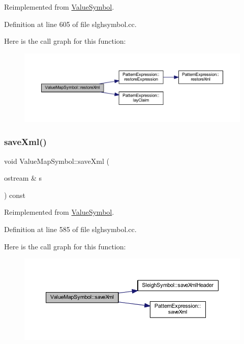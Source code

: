 Reimplemented from \mbox{\hyperlink{class_value_symbol_af9104983ea7381b608fe56b5ab8a2d7c}{Value\+Symbol}}.



Definition at line 605 of file slghsymbol.\+cc.

Here is the call graph for this function\+:
\nopagebreak
\begin{figure}[H]
\begin{center}
\leavevmode
\includegraphics[width=350pt]{class_value_map_symbol_a713f4ece8b103374e08d4b53f9ef174b_cgraph}
\end{center}
\end{figure}
\mbox{\label{class_value_map_symbol_aacceef585b6af757603b310a7173b860}} 
\subsubsection{\texorpdfstring{saveXml()}{saveXml()}}
{\footnotesize\ttfamily void Value\+Map\+Symbol\+::save\+Xml (\begin{DoxyParamCaption}\item[{ostream \&}]{s }\end{DoxyParamCaption}) const\hspace{0.3cm}{\ttfamily [virtual]}}



Reimplemented from \mbox{\hyperlink{class_value_symbol_aa7b4012d522c5864aea52486b0d47978}{Value\+Symbol}}.



Definition at line 585 of file slghsymbol.\+cc.

Here is the call graph for this function\+:
\nopagebreak
\begin{figure}[H]
\begin{center}
\leavevmode
\includegraphics[width=350pt]{class_value_map_symbol_aacceef585b6af757603b310a7173b860_cgraph}
\end{center}
\end{figure}
\mbox{\label{class_value_map_symbol_a11fcdd4ed7bb9ede9c5bb407436b85bf}} 

